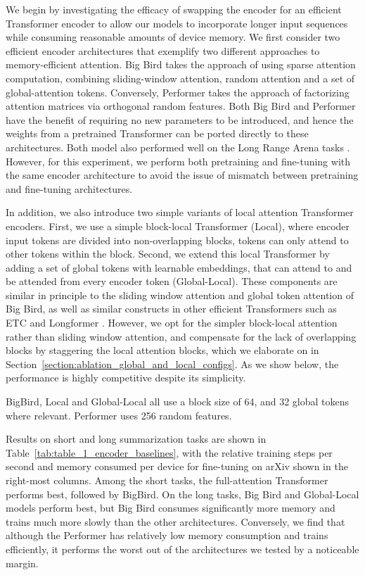 \documentclass[11pt]{article}
\begin{document}
We begin by investigating the efficacy of swapping the encoder for an efficient Transformer encoder to allow our models to incorporate longer input sequences while consuming reasonable amounts of device memory.
We first consider two efficient encoder architectures that exemplify two different approaches to memory-efficient attention.
Big Bird \citep{zaheer2020bigbird} takes the approach of using sparse attention computation, combining sliding-window attention, random attention and a set of global-attention tokens.
Conversely, Performer \citep{choromanski2021performer} takes the approach of factorizing attention matrices via orthogonal random features.
Both Big Bird and Performer have the benefit of requiring no new parameters to be introduced, and hence the weights from a pretrained Transformer can be ported directly to these architectures.
Both model also performed well on the Long Range Arena tasks \citep{tay2021long}.
However, for this experiment, we perform both pretraining and fine-tuning with the same encoder architecture to avoid the issue of mismatch between pretraining and fine-tuning architectures.

In addition, we also introduce two simple variants of local attention Transformer encoders.
First, we use a simple block-local Transformer (Local), where encoder input tokens are divided into non-overlapping blocks, tokens can only attend to other tokens within the block.
Second, we extend this local Transformer by adding a set of global tokens with learnable embeddings, that can attend to and be attended from every encoder token (Global-Local).
These components are similar in principle to the sliding window attention and global token attention of Big Bird, as well as similar constructs in other efficient Transformers such as ETC \citep{ainslie2020etc} and Longformer \citep{beltagy2020longformer}.
However, we opt for the simpler block-local attention rather than sliding window attention, and compensate for the lack of overlapping blocks by staggering the local attention blocks, which we elaborate on in Section~\ref{section:ablation_global_and_local_configs}.
As we show below, the performance is highly competitive despite its simplicity.

BigBird, Local and Global-Local all use a block size of 64, and 32 global tokens where relevant. Performer uses 256 random features.

Results on short and long summarization tasks are shown in Table~\ref{tab:table_1_encoder_baselines}, with the relative training steps per second and memory consumed per device for fine-tuning on arXiv shown in the right-most columns.
Among the short tasks, the full-attention Transformer performs best, followed by BigBird.
On the long tasks, Big Bird and Global-Local models perform best, but Big Bird consumes significantly more memory and trains much more slowly than the other architectures.
Conversely, we find that although the Performer has relatively low memory consumption and trains efficiently, it performs the worst out of the architectures we tested by a noticeable margin.
\end{document}
